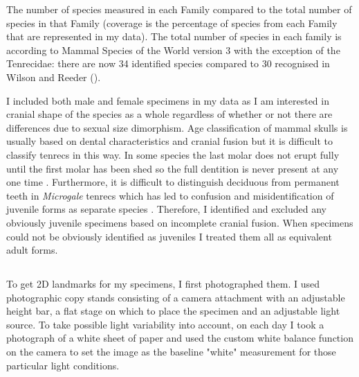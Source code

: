 

\begin{table}[h]
	\caption[Species measured] 
	{The number of species measured in each Family compared to the total number of species in that Family (coverage is the percentage of species from each Family that are represented in my data). The total number of species in each family is according to Mammal Species of the World version 3 \citep{Wilson2005} with the exception of the Tenrecidae: there are now 34 identified species compared to 30 recognised in Wilson and Reeder (\citeyear{Wilson2005}).}
		
	\label{tab:species.measured}
\end{table}
 

	I included both male and female specimens in my data as I am interested in cranial shape of the species as a whole regardless of whether or not there are differences due to sexual size dimorphism. Age classification of mammal skulls is usually based on dental characteristics and cranial fusion but it is difficult to classify tenrecs in this way. In some species the last molar does not erupt fully until the first molar has been shed so the full dentition is never present at any one time \citep{Nowak1983}. Furthermore, it is difficult to distinguish deciduous from permanent teeth in \textit{Microgale} tenrecs \citep{Asher2008} which has led to confusion and misidentification of juvenile forms as separate species \citep{Olson2004}.
	Therefore, I identified and excluded any obviously juvenile specimens based on incomplete cranial fusion. When specimens could not be obviously identified as juveniles I treated them all as equivalent adult forms. 	



\subsection{}

	To get 2D landmarks for my specimens, I first photographed them. I used photographic copy stands consisting of a camera attachment with an adjustable height bar, a flat stage on which to place the specimen and an adjustable light source. To take possible light variability into account, on each day I took a photograph of a white sheet of paper and used the custom white balance function on the camera to set the image as the baseline "white" measurement for those particular light conditions.
	
